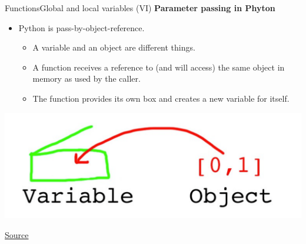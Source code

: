 \documentclass[10pt,compress]{beamer} %
\begin{document}
\begin{frame}{Functions}{Global and local variables (VI)}
\textbf{Parameter passing in Phyton}
\medskip
\begin{itemize}
\item Python is \alert{pass-by-object-reference}.
\begin{itemize}
\item A variable and an object are different things. 
\item A function receives a reference to (and will access) the same object in memory as used by the caller. %
\item The function provides its own box and creates a new variable for itself.  %
\end{itemize}
\end{itemize}

\medskip
\begin{center}
 \includegraphics[scale=0.25]{figs/var-objeto-Python.pdf}
 
\tiny{\href{http://robertheaton.com/2014/02/09/pythons-pass-by-object-reference-as-explained-by-philip-k-dick/}{Source}}
\end{center}
\end{frame}
\end{document}
